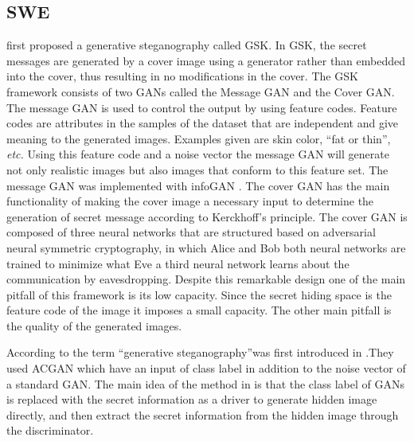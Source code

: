 \documentclass[../main/main.tex]{subfiles}
\begin{document}
	 \subsection{\gls{SWE}}
	   first proposed a generative steganography called \gls{GSK}. In \gls{GSK}, the secret messages are generated by a cover image using a generator rather than embedded into the cover, thus resulting in no modifications in the cover. The \gls{GSK} framework consists of two \gls{GAN}s called the Message \gls{GAN} and the Cover \gls{GAN}. The message \gls{GAN} is used to control the output by using feature codes. Feature codes are attributes in the samples of the dataset that are independent and give meaning to the generated images. Examples given are skin color, \textquotedblleft fat or thin\textquotedblright, \textit{etc.} Using this feature code and a noise vector the message \gls{GAN} will generate not only realistic images but also images that conform to this feature set. The message \gls{GAN} was implemented with \gls{infoGAN} . The cover \gls{GAN} has the main functionality of making the cover image a necessary input to determine the generation of secret message according to Kerckhoff's principle. The cover \gls{GAN} is composed of three neural networks that are structured based on adversarial neural symmetric cryptography, in which Alice and Bob both neural networks are trained to minimize what Eve a third neural network learns about the communication by eavesdropping. Despite this remarkable design one of the main pitfall of this framework is its low capacity. Since the secret hiding space is the feature code of the image it imposes a small capacity. The other main pitfall is the quality of the generated images.  
	  
	 According to  the term \textquotedblleft generative steganography\textquotedblright  was first introduced in .They used \gls{ACGAN} which have an input of class label in addition to the noise vector of a standard \gls{GAN}.  The main idea of the method in  is that the class label of \gls{GAN}s is replaced with the secret information as a driver to generate hidden image directly, and then extract the secret information from the hidden image through the discriminator. 
	 
\end{document}
